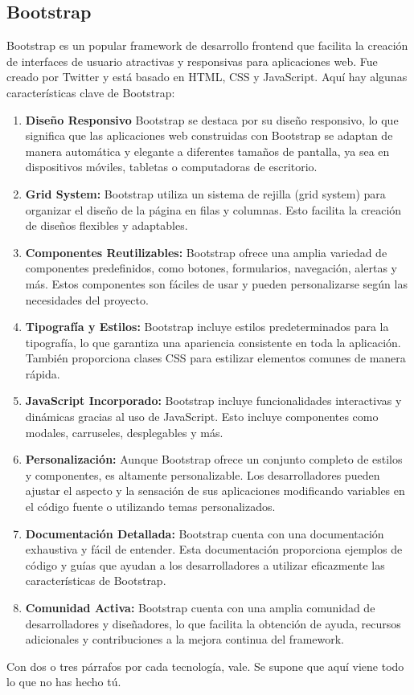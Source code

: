 \documentclass[a4paper, 12pt]{book}
\begin{document}
\subsection{Bootstrap}
\label{subsec:bootstrap}
Bootstrap es un popular framework de desarrollo frontend que facilita la creación de interfaces de usuario atractivas y responsivas para aplicaciones web. Fue creado por Twitter y está basado en HTML, CSS y JavaScript. Aquí hay algunas características clave de Bootstrap:

\begin{enumerate}
  \item \textbf{Diseño Responsivo} Bootstrap se destaca por su diseño responsivo, lo que significa que las aplicaciones web construidas con Bootstrap se adaptan de manera automática y elegante a diferentes tamaños de pantalla, ya sea en dispositivos móviles, tabletas o computadoras de escritorio.
  \item \textbf{Grid System:} Bootstrap utiliza un sistema de rejilla (grid system) para organizar el diseño de la página en filas y columnas. Esto facilita la creación de diseños flexibles y adaptables.
  \item \textbf{Componentes Reutilizables:} Bootstrap ofrece una amplia variedad de componentes predefinidos, como botones, formularios, navegación, alertas y más. Estos componentes son fáciles de usar y pueden personalizarse según las necesidades del proyecto.
  \item \textbf{Tipografía y Estilos:} Bootstrap incluye estilos predeterminados para la tipografía, lo que garantiza una apariencia consistente en toda la aplicación. También proporciona clases CSS para estilizar elementos comunes de manera rápida.
  \item \textbf{JavaScript Incorporado:} Bootstrap incluye funcionalidades interactivas y dinámicas gracias al uso de JavaScript. Esto incluye componentes como modales, carruseles, desplegables y más.
  \item \textbf{Personalización:} Aunque Bootstrap ofrece un conjunto completo de estilos y componentes, es altamente personalizable. Los desarrolladores pueden ajustar el aspecto y la sensación de sus aplicaciones modificando variables en el código fuente o utilizando temas personalizados.
  \item \textbf{Documentación Detallada:} Bootstrap cuenta con una documentación exhaustiva y fácil de entender. Esta documentación proporciona ejemplos de código y guías que ayudan a los desarrolladores a utilizar eficazmente las características de Bootstrap.
  \item \textbf{Comunidad Activa:} Bootstrap cuenta con una amplia comunidad de desarrolladores y diseñadores, lo que facilita la obtención de ayuda, recursos adicionales y contribuciones a la mejora continua del framework.
\end{enumerate}
Con dos o tres párrafos por cada tecnología, vale. 
Se supone que aquí viene todo lo que no has hecho tú.
\end{document}
